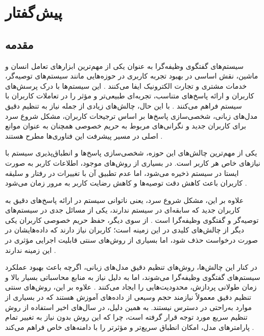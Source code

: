 
\chapter{پیش گفتار}

\section{مقدمه}

سیستم‌های گفتگوی وظیفه‌گرا به عنوان یکی از مهم‌ترین ابزارهای تعامل انسان و ماشین، نقش اساسی در بهبود تجربه کاربری در حوزه‌هایی مانند سیستم‌های توصیه‌گر، خدمات مشتری و تجارت الکترونیک ایفا می‌کنند \cite{camilleri2024artificial}. این سیستم‌ها با درک پرسش‌های کاربران و ارائه پاسخ‌های متناسب، تجربه‌ای طبیعی‌تر و مؤثر را در تعاملات کاربران با سیستم فراهم می‌کنند 
\cite{bocklisch2024task}. 
با این حال، چالش‌های زیادی از جمله نیاز به تنظیم دقیق مدل‌های زبانی، شخصی‌سازی پاسخ‌ها بر اساس ترجیحات کاربران، مشکل شروع سرد برای کاربران جدید و نگرانی‌های مربوط به حریم خصوصی همچنان به عنوان موانع اصلی در مسیر پیشرفت این فناوری‌ها مطرح هستند 
\cite{yuan2023user}.

یکی از مهم‌ترین چالش‌های این حوزه، شخصی‌سازی پاسخ‌ها و انطباق‌پذیری سیستم با نیازهای خاص هر کاربر است. در بسیاری از روش‌های موجود، اطلاعات کاربر به صورت ایستا در سیستم ذخیره می‌شود، اما عدم تطبیق آن با تغییرات در رفتار و سلیقه کاربران باعث کاهش دقت توصیه‌ها و کاهش رضایت کاربر به مرور زمان می‌شود 
\cite{azzam2022model}. 

علاوه بر این، مشکل شروع سرد، یعنی ناتوانی سیستم در ارائه پاسخ‌های دقیق به کاربران جدید که سابقه‌ای در سیستم ندارند، یکی از مسائل جدی در سیستم‌های توصیه‌گر و گفتگوی وظیفه‌گرا است
 \cite{yuan2023user}. 
از سوی دیگر، حفظ حریم خصوصی کاربران یکی دیگر از چالش‌های کلیدی در این زمینه است؛ کاربران نیاز دارند که داده‌هایشان در صورت درخواست حذف شود، اما بسیاری از روش‌های سنتی قابلیت اجرایی مؤثری در این زمینه ندارند
 \cite{zhang2024right}.

در کنار این چالش‌ها، روش‌های تنظیم دقیق مدل‌های زبانی، اگرچه باعث بهبود عملکرد سیستم‌های گفتگوی وظیفه‌گرا می‌شوند، اما به دلیل نیاز به منابع محاسباتی بسیار بالا و زمان طولانی پردازش، محدودیت‌هایی را ایجاد می‌کنند 
\cite{kasahara2022building}. 
علاوه بر این، روش‌های سنتی تنظیم دقیق معمولاً نیازمند حجم وسیعی از داده‌های آموزش هستند که در بسیاری از موارد به‌راحتی در دسترس نیستند. به همین دلیل، در سال‌های اخیر استفاده از روش تنظیم سریع مورد توجه قرار گرفته است، چرا که این روش بدون نیاز به تغییر تمام پارامترهای مدل، امکان انطباق سریع‌تر و مؤثرتر را با دامنه‌های خاص فراهم می‌کند 
\cite{madotto2021few}.

